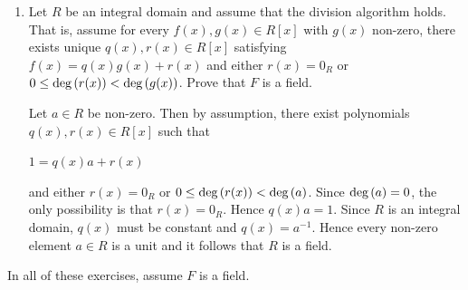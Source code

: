 \documentclass[11pt,fleqn,dvipsnames,usenames]{article}
\newcommand{\p}{\noindent}
\begin{document}
\begin{enumerate}
\item Let $R$ be an integral domain and assume that the division algorithm holds.  That is, assume for every $f(x),g(x)\in R[x]$ with $g(x)$ non-zero, there exists unique $q(x), r(x)\in R[x]$ satisfying $f(x) = q(x)g(x) + r(x)$ and either $r(x) = 0_{R}$ or $0 \leq\text{deg}\left(r(x)\right) < \text{deg}\left(g(x)\right)$.  Prove that $F$ is a field.
\vsmsp

\solution Let $a\in R$ be non-zero.  Then by assumption, there exist polynomials $q(x),r(x)\in R[x]$ such that
\begin{center}
$1 = q(x)a + r(x)$
\end{center}
and either $r(x) = 0_{R}$ or $0\leq \text{deg}\left(r(x)\right) < \text{deg}\left(a\right)$.  Since $\text{deg}\left(a\right) = 0$, the only possibility is that $r(x) = 0_{R}$.  Hence $q(x)a = 1$.  Since $R$ is an integral domain, $q(x)$ must be constant and $q(x) = a^{-1}$.  Hence every non-zero element $a\in R$ is a unit and it follows that $R$ is a field.
\end{enumerate}
\vsp

\p {\huge \S5.3 Solutions}
\vsp

\p In all of these exercises, assume $F$ is a field.
\end{document}
